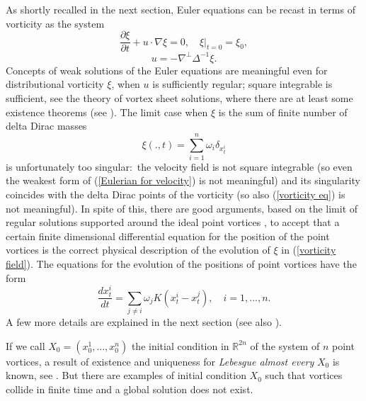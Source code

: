 \documentclass[11pt,a4paper]{article}%
\begin{document}
As shortly recalled in the next section, Euler equations can be recast in
terms of vorticity as the system
\begin{equation}
\frac{\partial\xi}{\partial
t}+u\cdot\nabla\xi=0,\quad\xi|_{t=0}=\xi_{0},
\label{vorticity eq}%
\end{equation}%
\begin{equation}
u=-\nabla^{\perp}\Delta^{-1}\xi. \label{Biot Sav}%
\end{equation}
Concepts of weak solutions of the Euler equations are meaningful
even for distributional vorticity $\xi$, when $u$ is sufficiently
regular; square integrable is sufficient, see the theory of vortex
sheet solutions, where there are at least some existence theorems
(see \cite{MajdaBert}). The limit case when $\xi$ is the sum of
finite number of delta Dirac masses
\begin{equation}
\xi( .,t) =\sum_{i=1}^{n}\omega_{i}\delta_{x_{t}^{i}}
 \label{vorticity field}%
\end{equation}
is unfortunately too singular:\ the velocity field is not square
integrable (so even the weakest form of (\ref{Eulerian for
velocity}) is not meaningful) and its singularity coincides with the
delta Dirac points of the vorticity (so also (\ref{vorticity eq}) is
not meaningful). In spite of this, there are good arguments, based
on the limit of regular solutions supported around the ideal point
vortices \cite{March Pulv}, to accept that a certain finite
dimensional differential equation for the position of the point
vortices is the correct physical description of the evolution of
 $\xi $ in  (\ref{vorticity field}). The equations for the evolution
of the positions of point vortices have the
form%
\begin{equation}
\frac{dx_{t}^{i}}{dt}=\sum_{j\neq i}\omega_{j}K( x_{t}^{i}-x_{t}^{j}) ,\quad
i=1,...,n. \label{det point vort intro}%
\end{equation}
A few more details are explained in the next section  (see also \cite{Newton}).

If we call $X_{0}=( x_{0}^{1},...,x_{0}^{n}) $ the initial condition in
$\mathbb{R}^{2n}$ of the system of $n$ point vortices, a result of existence
and uniqueness for \emph{Lebesgue almost every} $X_{0}$ is known, see
\cite{March Pulv}. But there are examples of initial condition $X_{0}$ such
that vortices collide in finite time and a global solution does not exist.
\end{document}
